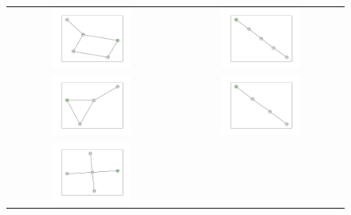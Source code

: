 \documentclass[12pt, a4paper]{extarticle}
\begin{document}
\begin{figure}\centering\begin{tabularx}{\textwidth}{cc}
\includegraphics[width=0.5\textwidth]{task11-graphlets/5_16-18-25-23-26.pdf} &
\includegraphics[width=0.5\textwidth]{task11-graphlets/5_12-14-13-21-23.pdf} \\
\includegraphics[width=0.5\textwidth]{task11-graphlets/4_21-25-20-23.pdf} &
\includegraphics[width=0.5\textwidth]{task11-graphlets/4_14-16-25-23.pdf} \\
\includegraphics[width=0.5\textwidth]{task11-graphlets/5_14-21-20-22-23.pdf} &

\end{tabularx}
\end{figure}
\end{document}
